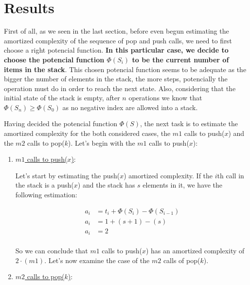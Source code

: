 \documentclass[12p]{report}
\begin{document}
 
  \section{Results}			%

First of all, as we seen in the last section, before even begun estimating the amortized complexity of the sequence of pop and push calls, we need to first choose a right potencial function. \textbf{In this particular case, we decide to choose the potencial function $\Phi(S_{i})$ to be the current number of items in the stack}. This chosen potencial function seems to be adequate as the bigger the number of elements in the stack, the more steps, potencially the operation must do in order to reach the next state. Also, considering that the initial state of the stack is empty, after $n$ operations we know that $\Phi(S_{n}) \geq \Phi(S_{0})$ as no negative index are allowed into a stack.

\bigskip

Having decided the potencial function $\Phi(S)$, the next task is to estimate the amortized complexity for the both considered cases, the $m1$ calls to push($x$) and the $m2$ calls to pop($k$). Let's begin with the $m1$ calls to push($x$):

\bigskip

\begin{enumerate}
\item \underline{$m1$ calls to push($x$)}:

Let's start by estimating the push($x$) amortized complexity. If the $i$th call in the stack is a push($x$) and the stack has $s$ elements in it, we have the following estimation:

\Large
\begin{align}
\nonumber
a_{i} &= t_{i} + \Phi(S_{i}) - \Phi(S_{i-1}) \\
\nonumber
a_{i} &= 1 + (s+1) - (s) \\
\nonumber
a_{i} &= 2 \\
\nonumber
\end{align}

\large
So we can conclude that $m1$ calls to push($x$) has an amortized complexity of $2\cdot(m1)$. Let's now examine the case of the $m2$ calls of pop($k$).

\bigskip

\item \underline{$m2$ calls to pop($k$)}:
\end{enumerate}
\end{document}
